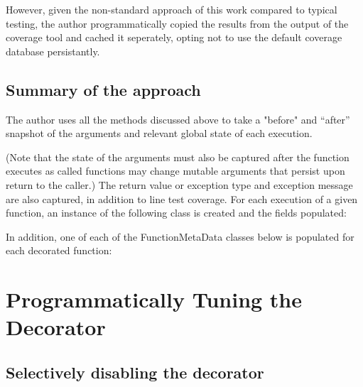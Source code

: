 

However, given the non-standard
approach of this work compared to typical testing, the author programmatically
copied the results from the output of the coverage tool and cached it seperately, 
opting not to use the default coverage database persistantly.

\subsection{Summary of the approach}\label{sec:approach-internal-5}

The author uses all the methods discussed above to take a "before" and “after” 
snapshot of the arguments and relevant global state of each execution. 

(Note that the state of the arguments must also be captured after the function 
executes as called functions may change mutable arguments that persist upon 
return to the caller.) The return value or exception type and exception message
 are also captured, in addition to line test coverage. 
 For each execution of a given function, an instance of the 
 following class is created and the fields populated:



In addition, one of each of the FunctionMetaData classes below is populated for each decorated function:



\section{Programmatically Tuning the Decorator}\label{sec:decorator tuning}

\subsection{Selectively disabling the decorator}\label{sec:tuning-1}


